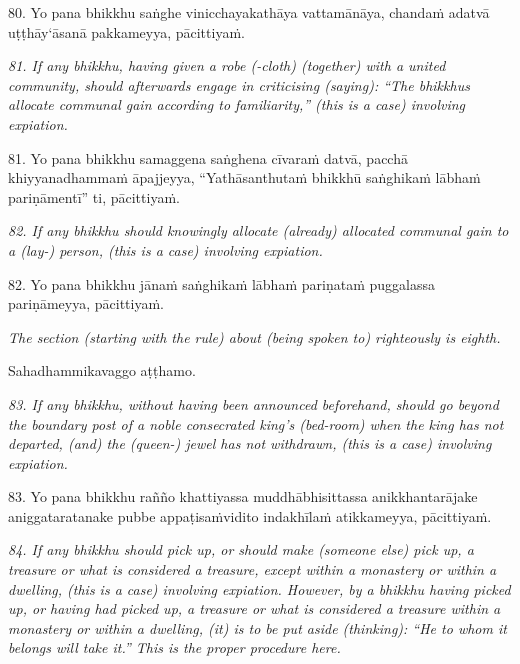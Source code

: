 \documentclass[11pt]{article}
\begin{document}
\begin{paracol}{2}
\begin{column}
\begin{flushleft}
80. Yo pana bhikkhu saṅghe vinicchayakathāya vattamānāya, chandaṁ adatvā uṭṭhāy‘āsanā pakkameyya, pācittiyaṁ.
\switchcolumn*
\end{flushleft}

{\itshape\footnotesize
81. If any bhikkhu, having given a robe (-cloth) (together) with a united community, should afterwards engage in criticising (saying): “The bhikkhus allocate communal gain according to familiarity,” (this is a case) involving expiation.
}
\switchcolumn

\begin{flushleft}
81. Yo pana bhikkhu samaggena saṅghena cīvaraṁ datvā, pacchā khiyyanadhammaṁ āpajjeyya, “Yathāsanthutaṁ bhikkhū saṅghikaṁ lābhaṁ pariṇāmentī” ti, pācittiyaṁ.
\switchcolumn*
\end{flushleft}

{\itshape\footnotesize
82. If any bhikkhu should knowingly allocate (already) allocated communal gain to a (lay-) person, (this is a case) involving expiation.
}
\switchcolumn

\begin{flushleft}
82. Yo pana bhikkhu jānaṁ saṅghikaṁ lābhaṁ pariṇataṁ puggalassa pariṇāmeyya, pācittiyaṁ.
\switchcolumn*
\end{flushleft}

{\itshape\footnotesize
The section (starting with the rule) about (being spoken to) righteously is eighth.
}
\switchcolumn

\begin{flushleft}
Sahadhammikavaggo aṭṭhamo.
\switchcolumn*
\end{flushleft}

{\itshape\footnotesize
83. If any bhikkhu, without having been announced beforehand, should go beyond the boundary post of a noble consecrated king's (bed-room) when the king has not departed, (and) the (queen-) jewel has not withdrawn, (this is a case) involving expiation.
}
\switchcolumn

\begin{flushleft}
83. Yo pana bhikkhu rañño khattiyassa muddhābhisittassa anikkhantarājake aniggataratanake pubbe appaṭisaṁvidito indakhīlaṁ atikkameyya, pācittiyaṁ.
\switchcolumn*
\end{flushleft}

{\itshape\footnotesize
84. If any bhikkhu should pick up, or should make (someone else) pick up, a treasure or what is considered a treasure, except within a monastery or within a dwelling, (this is a case) involving expiation. However, by a bhikkhu having picked up, or having had picked up, a treasure or what is considered a treasure within a monastery or within a dwelling, (it) is to be put aside (thinking): “He to whom it belongs will take it.” This is the proper procedure here.
}
\switchcolumn


\end{column}
\end{paracol}
\end{document}
